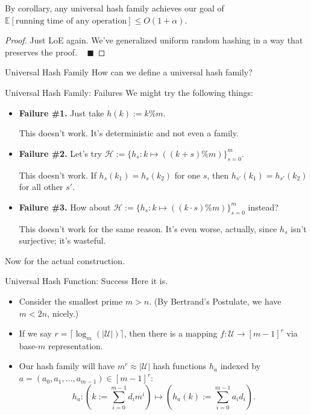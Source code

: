 By corollary, any universal hash family achieves our goal of $\mathbb{E}[\text{running time of any operation}] \leq O(1 + \alpha)$.

\begin{proof}
    Just LoE again.  We've generalized uniform random hashing in a way that preserves the proof. ~ $\blacksquare$
\end{proof}

\begin{problem}{Universal Hash Family}
    How can we define a universal hash family?
\end{problem}

\begin{solution}{Universal Hash Family: Failures}
    We might try the following things:
    \begin{itemize}
        \item \textbf{Failure \#1.} Just take $h(k) := k \% m$.
        
        This doesn't work.  It's deterministic and not even a family.
        \item \textbf{Failure \#2.} Let's try $\mathcal{H} := \{h_s: k \mapsto ((k + s) \% m)\}_{s = 0}^m$.
        
        This doesn't work.  If $h_{s}(k_1) = h_{s}(k_2)$ for one $s$, then $h_{s'}(k_1) = h_{s'}(k_2)$ for all other $s'$.
        \item \textbf{Failure \#3.} How about $\mathcal{H} := \{h_s: k \mapsto ((k \cdot s) \% m)\}_{s = 0}^m$ instead?

        This doesn't work for the same reason.  It's even worse, actually, since $h_s$ isn't surjective; it's wasteful.
    \end{itemize}
\end{solution}

Now for the actual construction.

\begin{solution}{Universal Hash Function: Success}
    Here it is.
    \begin{itemize}
        \item Consider the smallest prime $m > n$.  (By Bertrand's Postulate, we have $m < 2n$, nicely.)
        \item If we say $r = \lceil \log_m(|\mathcal{U}|) \rceil$, then there is a mapping $f: \mathcal{U} \to [m - 1]^r$ via base-$m$ representation.
        \item Our hash family will have $m^r \approx |\mathcal{U}|$ hash functions $h_a$ indexed by $a = (a_0, a_1, \dots, a_{m - 1}) \in [m - 1]^r$:
        \[ h_a: \left( k := \sum_{i = 0}^{m - 1} d_i m^i \right) \mapsto \left( h_a(k) :=  \sum_{i = 0}^{m - 1} a_i d_i \right). \]
    \end{itemize}
\end{solution}

